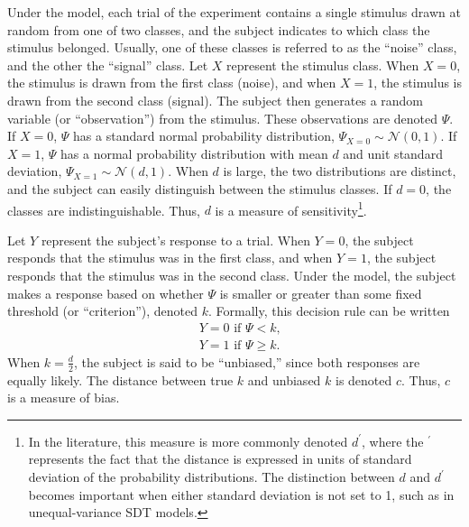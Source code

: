 \documentclass[man]{apa6}
\begin{document}
Under the model, each trial of the experiment contains a single stimulus drawn at random from one of two classes, and the subject indicates to which class the stimulus belonged. Usually, one of these classes is referred to as the ``noise'' class, and the other the ``signal'' class. Let $X$ represent the stimulus class. When $X=0$, the stimulus is drawn from the first class (noise), and when $X=1$, the stimulus is drawn from the second class (signal). The subject then generates a random variable (or ``observation'') from the stimulus. These observations are denoted $\Psi$. If $X=0$, $\Psi$ has a standard normal probability distribution, $\Psi_{X=0}\sim{}\mathcal{N}\left(0,1\right)$. If $X=1$, $\Psi$ has a normal probability distribution with mean $d$ and unit standard deviation,
$\Psi_{X=1}\sim{}\mathcal{N}\left(d,1\right)$. When $d$ is large, the two distributions are distinct, and the subject can easily distinguish between the stimulus classes. If $d=0$, the classes are indistinguishable. Thus, $d$ is a measure of sensitivity\footnote{In the literature, this measure is more commonly denoted $d^\prime$, where the $^\prime$ represents the fact that the distance is expressed in units of standard deviation of the probability distributions. The distinction between $d$ and $d^\prime$ becomes important when either standard deviation is not set to 1, such as in unequal-variance SDT models.}.

Let $Y$ represent the subject's response to a trial. When $Y=0$, the subject responds that the stimulus was in the first class, and when $Y=1$, the subject responds that the stimulus was in the second class. Under the model, the subject makes a response based on whether $\Psi$ is smaller or greater than some fixed threshold (or ``criterion''), denoted $k$. Formally, this decision rule can be written
\begin{eqnarray*}
&Y=0\textrm{ if }\Psi<k\textrm{,}\\
&Y=1\textrm{ if }\Psi\ge{}k\textrm{.}
\end{eqnarray*}When $k=\frac{d}{2}$, the subject is said to be ``unbiased,'' since both responses are equally likely. The distance between true $k$ and unbiased $k$ is denoted $c$. Thus, $c$ is a measure of bias.
\end{document}
